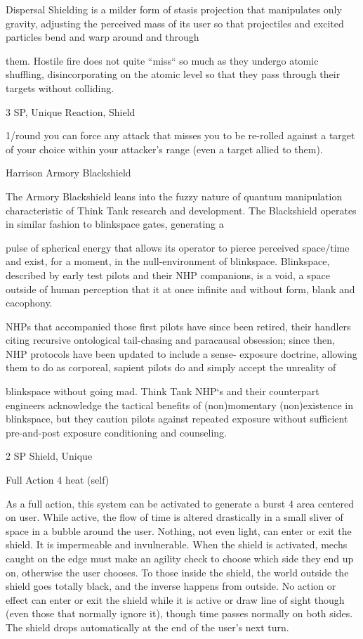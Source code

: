 Dispersal Shielding is a milder form of stasis projection that manipulates only gravity, adjusting the
perceived mass of its user so that projectiles and excited particles bend and warp around and through




them. Hostile fire does not quite “miss“ so much as they undergo atomic shuffling, disincorporating on the
atomic level so that they pass through their targets without colliding.

3 SP, Unique
Reaction, Shield

1/round you can force any attack that misses you to be re-rolled against a target of your choice
within your attacker’s range (even a target allied to them).


Harrison Armory Blackshield

The Armory Blackshield leans into the fuzzy nature of quantum manipulation characteristic of Think Tank
research and development. The Blackshield operates in similar fashion to blinkspace gates, generating a

pulse of spherical energy that allows its operator to pierce perceived space/time and exist, for a moment, in
the null-environment of blinkspace. Blinkspace, described by early test pilots and their NHP companions, is
a void, a space outside of human perception that it at once infinite and without form, blank and cacophony.

NHPs that accompanied those first pilots have since been retired, their handlers citing recursive ontological
tail-chasing and paracausal obsession; since then, NHP protocols have been updated to include a sense-
exposure doctrine, allowing them to do as corporeal, sapient pilots do and simply accept the unreality of

blinkspace without going mad. Think Tank NHP‘s and their counterpart engineers acknowledge the tactical
benefits of (non)momentary (non)existence in blinkspace, but they caution pilots against repeated exposure
without sufficient pre-and-post exposure conditioning and counseling.

2 SP
Shield, Unique

Full Action
4 heat (self)

As a full action, this system can be activated to generate a burst 4 area centered on user. While
active, the flow of time is altered drastically in a small sliver of space in a bubble around the user.
Nothing, not even light, can enter or exit the shield. It is impermeable and invulnerable. When the
shield is activated, mechs caught on the edge must make an agility check to choose which side
they end up on, otherwise the user chooses. To those inside the shield, the world outside the
shield goes totally black, and the inverse happens from outside. No action or effect can enter or
exit the shield while it is active or draw line of sight though (even those that normally ignore it),
though time passes normally on both sides. The shield drops automatically at the end of the
user’s next turn.


